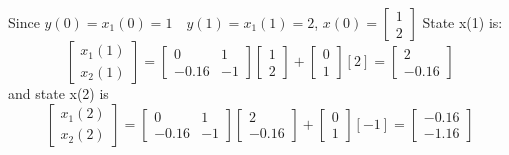 Since $y(0)=x_1(0)=1 \quad y(1)=x_1(1)=2$, $x(0)= \begin{bmatrix}
1 \\ 2
\end{bmatrix}$
State x(1) is:
	\[
	\begin{bmatrix}
	x_1(1) \\
	x_2(1)
	\end{bmatrix} = 	\begin{bmatrix}
	0     &  1 \\
	-0.16 & -1
	\end{bmatrix}	\begin{bmatrix}
	1 \\
	2
	\end{bmatrix}+	\begin{bmatrix}
	0 \\
	1
	\end{bmatrix}[2]=	\begin{bmatrix}
	2 \\
	-0.16
	\end{bmatrix}
	\]
and state x(2) is
	\[
\begin{bmatrix}
x_1(2) \\
x_2(2)
\end{bmatrix} = 	\begin{bmatrix}
0     &  1 \\
-0.16 & -1
\end{bmatrix}	\begin{bmatrix}
2 \\
-0.16
\end{bmatrix}+	\begin{bmatrix}
0 \\
1
\end{bmatrix}[-1]=	\begin{bmatrix}
-0.16 \\
-1.16
\end{bmatrix}
\]